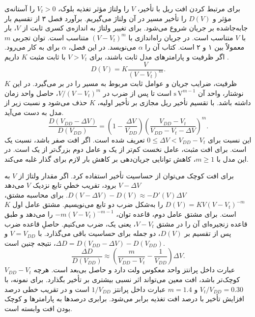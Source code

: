 برای مرتبط کردن افت ریل با تأخیر، \(V\) را ولتاژ مؤثر تغذیه بلوک،
\(V_t>0\) را آستانه‌ی مؤثر و \(D(V)\) را تأخیر مسیر در آن ولتاژ
می‌گیریم. برآورد فصل ۳ از تقسیم بار جابه‌جاشده بر جریان شروع می‌شود.
برای تغییر ولتاژ به اندازه‌ی کسری ثابت از \(V\)، بار با \(V\) متناسب
است. در  جریان راه‌اندازی با \((V-V_t)^m\)
متناسب است. توان تجربی \(m\) معمولاً بین ۱ و ۲ است. کتاب آن را
\(\alpha\) می‌نویسد. در این فصل، \(\alpha\) برای 
به کار می‌رود. اگر ظرفیت و پارامترهای مدل ثابت باشند، برای \(V>V_t\)
با ثابت مثبت \(K\) داریم
\cite[رابطه ، صفحه ۱۶۲]{weste}.
\begin{equation}
  D(V)=K\frac{V}{(V-V_t)^m}.
  \label{eq:power-above-threshold-delay}
\end{equation}
\(K\) ظرفیت، ضرایب جریان و عوامل ثابت مربوط به مسیر را در بر می‌گیرد.
در این نوشتار، واحد آن \(\mathrm{s}\,\mathrm{V}^{m-1}\) است تا پس
از ضرب در \(V/(V-V_t)^m\)، حاصل واحد زمان داشته باشد. با تقسیم تأخیر ریل
مجازی بر تأخیر اولیه، \(K\) حذف می‌شود و نسبت زیر از مدل به دست می‌آید.
\begin{equation}
  \frac{D(V_{DD}-\Delta V)}{D(V_{DD})}
    =\left(1-\frac{\Delta V}{V_{DD}}\right)
      \left(\frac{V_{DD}-V_t}{V_{DD}-V_t-\Delta V}\right)^m.
  \label{eq:power-droop-delay-ratio}
\end{equation}
این نسبت برای \(0\leq\Delta V<V_{DD}-V_t\) تعریف شده است. اگر
افت صفر باشد، نسبت یک است. برای افت مثبت، عامل نخست کم‌تر از یک
و عامل دوم بزرگ‌تر از یک است. در این مدل با \(m\geq 1\)، کاهش
توانایی جریان‌دهی بر کاهش بار لازم برای گذار غلبه می‌کند.

برای افت کوچک می‌توان از حساسیت تأخیر استفاده کرد. اگر مقدار ولتاژ
از \(V\) به \(V-\Delta V\) برود، تقریب خطیِ تابع نزدیک \(V\)
می‌دهد \(D(V-\Delta V)-D(V)\approx-D'(V)\Delta V\).
برای محاسبه مشتق، \(D(V)=KV(V-V_t)^{-m}\) را به‌شکل ضرب دو
تابع می‌نویسیم. مشتق عامل اول \(K\) است. برای مشتق عامل دوم، قاعده
توان، \(-m(V-V_t)^{-m-1}\) را می‌دهد و طبق قاعده زنجیره‌ای آن را
در مشتق \(V-V_t\)، یعنی یک، ضرب می‌کنیم. حاصلِ قاعده ضرب پس از تقسیم بر
\(D(V)\)، دو جمله برای حساسیت باقی می‌گذارد. با \(V=V_{DD}\)
و \(\Delta D=D(V_{DD}-\Delta V)-D(V_{DD})\)، نتیجه چنین است.
\begin{equation}
  \frac{\Delta D}{D(V_{DD})}
  \approx\left(\frac{m}{V_{DD}-V_t}-\frac{1}{V_{DD}}\right)\Delta V.
  \label{eq:power-droop-delay-sensitivity}
\end{equation}
عبارت داخل پرانتز واحد معکوس ولت دارد و حاصل بی‌بعد است. هرچه
\(V_{DD}-V_t\) کوچک‌تر باشد، افت معین می‌تواند اثر نسبی بیشتری
بر تأخیر بگذارد. برای نمونه، با \(V_t/V_{DD}=0.30\) و \(m=1.4\)
عبارت داخل پرانتز \(1/V_{DD}\) است و در تقریب خطی درصد افزایش
تأخیر با درصد افت تغذیه برابر می‌شود. برابری درصدها به پارامترها
و کوچک بودن افت وابسته است.

